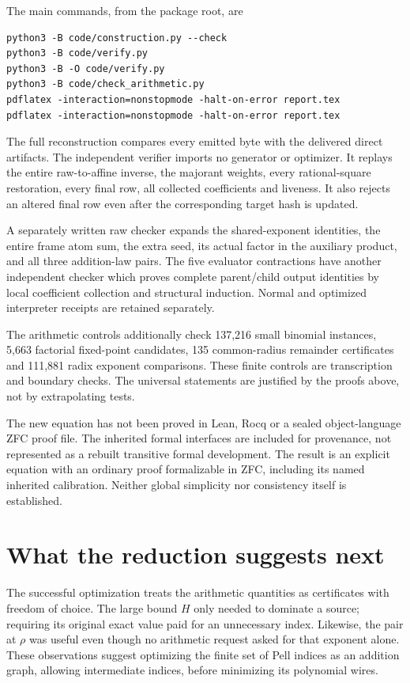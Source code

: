 \documentclass[11pt]{article}
\theoremstyle{definition}\newtheorem{definition}[theorem]{Definition}
\begin{document}
The main commands, from the package root, are
\begin{verbatim}
python3 -B code/construction.py --check
python3 -B code/verify.py
python3 -B -O code/verify.py
python3 -B code/check_arithmetic.py
pdflatex -interaction=nonstopmode -halt-on-error report.tex
pdflatex -interaction=nonstopmode -halt-on-error report.tex
\end{verbatim}
The full reconstruction compares every emitted byte with the delivered
direct artifacts. The independent verifier imports no generator or
optimizer. It replays the entire raw-to-affine inverse, the majorant
weights, every rational-square restoration, every final row, all
collected coefficients and liveness. It also rejects an altered final
row even after the corresponding target hash is updated.

A separately written raw checker expands the shared-exponent identities,
the entire frame atom sum, the extra seed, its actual factor in the
auxiliary product, and all three addition-law pairs. The five evaluator
contractions have another independent checker which proves complete
parent/child output identities by local coefficient collection and
structural induction. Normal and optimized interpreter receipts are
retained separately.

The arithmetic controls additionally check 137,216 small binomial
instances, 5,663 factorial fixed-point candidates, 135 common-radius
remainder certificates and 111,881 radix exponent comparisons. These
finite controls are transcription and boundary checks. The universal
statements are justified by the proofs above, not by extrapolating tests.

The new equation has not been proved in Lean, Rocq or a sealed
object-language ZFC proof file. The inherited formal interfaces are
included for provenance, not represented as a rebuilt transitive formal
development. The result is an explicit equation with an ordinary proof
formalizable in ZFC, including its named inherited calibration. Neither
global simplicity nor consistency itself is established.



\section{What the reduction suggests next}
The successful optimization treats the arithmetic quantities as
certificates with freedom of choice. The large bound $H$ only needed
to dominate a source; requiring its original exact value paid for an
unnecessary index. Likewise, the pair at $\rho$ was useful even though
no arithmetic request asked for that exponent alone. These observations
suggest optimizing the finite set of Pell indices as an addition graph,
allowing intermediate indices, before minimizing its polynomial wires.
\end{document}
